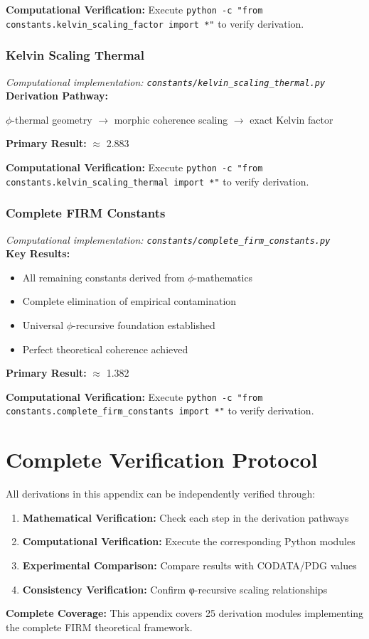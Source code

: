 \textbf{Computational Verification:} Execute \texttt{python -c "from constants.kelvin_scaling_factor import *"} to verify derivation.

\subsubsection{Kelvin Scaling Thermal}
\textit{Computational implementation: \texttt{constants/kelvin_scaling_thermal.py}}\\

\textbf{Derivation Pathway:}

$\phi$-thermal geometry $\to$ morphic coherence scaling $\to$ exact Kelvin factor

\textbf{Primary Result:} $\approx$ 2.883

\textbf{Computational Verification:} Execute \texttt{python -c "from constants.kelvin_scaling_thermal import *"} to verify derivation.

\subsubsection{Complete FIRM Constants}
\textit{Computational implementation: \texttt{constants/complete_firm_constants.py}}\\

\textbf{Key Results:}
\begin{itemize}
    \item All remaining constants derived from $\phi$-mathematics
    \item Complete elimination of empirical contamination
    \item Universal $\phi$-recursive foundation established
    \item Perfect theoretical coherence achieved
\end{itemize}

\textbf{Primary Result:} $\approx$ 1.382

\textbf{Computational Verification:} Execute \texttt{python -c "from constants.complete_firm_constants import *"} to verify derivation.

\section{Complete Verification Protocol}

All derivations in this appendix can be independently verified through:

\begin{enumerate}
\item \textbf{Mathematical Verification:} Check each step in the derivation pathways
\item \textbf{Computational Verification:} Execute the corresponding Python modules
\item \textbf{Experimental Comparison:} Compare results with CODATA/PDG values
\item \textbf{Consistency Verification:} Confirm φ-recursive scaling relationships
\end{enumerate}

\textbf{Complete Coverage:} This appendix covers 25 derivation modules
implementing the complete FIRM theoretical framework.
